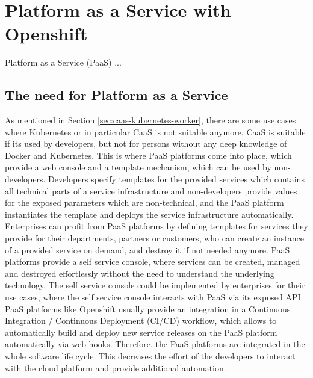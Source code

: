 \chapter{Platform as a Service with Openshift}
\label{cha:paas}
Platform as a Service (PaaS) ...

\section{The need for Platform as a Service}
\label{sec:paas-need-for-paas}
As mentioned in Section \vref{sec:caas-kubernetes-worker}, there are some use cases where Kubernetes or in particular CaaS is not suitable anymore. CaaS is suitable if its used by developers, but not for persons without any deep knowledge of Docker and Kubernetes. This is where PaaS platforms come into place, which provide a web console and a template mechanism, which can be used by non-developers. Developers specify templates for the provided services which contains all technical parts of a service infrastructure and non-developers provide values for the exposed parameters which are non-technical, and the PaaS platform instantiates the template and deploys the service infrastructure automatically. \\

Enterprises can profit from PaaS platforms by defining templates for services they provide for their departments, partners or customers, who can create an instance of a provided service on demand, and destroy it if not needed anymore. PaaS platforms provide a self service console, where services can be created, managed and destroyed effortlessly without the need to understand the underlying technology. The self service console could be implemented by enterprises for their use cases, where the self service console interacts with PaaS via its exposed API. \\

PaaS platforms like Openshift usually provide an integration in a Continuous Integration / Continuous Deployment (CI/CD) workflow, which allows to automatically build and deploy new service releases on the PaaS platform automatically via web hooks. Therefore, the PaaS platforms are integrated in the whole software life cycle. This decreases the effort of the developers to interact with the cloud platform and provide additional automation.

